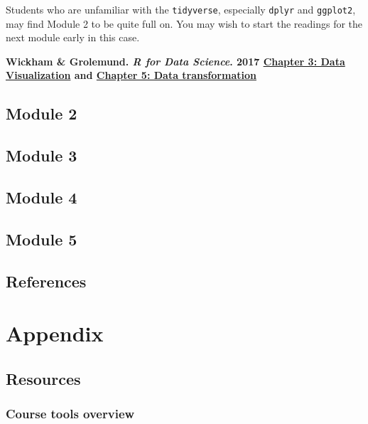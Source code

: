\documentclass[
  openany]{book}
\begin{document}
Students who are unfamiliar with the \texttt{tidyverse}, especially \texttt{dplyr} and \texttt{ggplot2}, may find Module 2 to be quite full on. You may wish to start the readings for the next module early in this case.

\textbf{Wickham \& Grolemund. \emph{R for Data Science}. 2017 \href{https://r4ds.had.co.nz/data-visualisation.html}{Chapter 3: Data Visualization} and \href{https://r4ds.had.co.nz/transform.html}{Chapter 5: Data transformation}}

\hypertarget{m2}{%
\chapter{Module 2}\label{m2}}

\hypertarget{module-3}{%
\chapter{Module 3}\label{module-3}}

\hypertarget{module-4}{%
\chapter{Module 4}\label{module-4}}

\hypertarget{module-5}{%
\chapter{Module 5}\label{module-5}}

\hypertarget{references}{%
\chapter*{References}\label{references}}

\hypertarget{part-appendix}{%
\part*{Appendix}\label{part-appendix}}

\hypertarget{resources}{%
\chapter{Resources}\label{resources}}

\hypertarget{course-tools-overview}{%
\section{Course tools overview}\label{course-tools-overview}}
\end{document}
